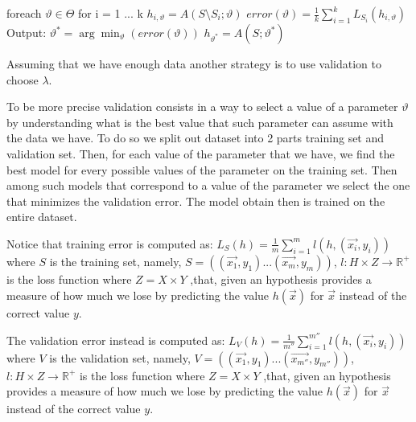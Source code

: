 \documentclass[a4paper,11pt,oneside]{book}
\begin{document}
\begin{enumerate}
\begin{solution}
                foreach $\vartheta \in \Theta$
                for i = 1 ... k
                    $h_{i,\vartheta} = A(S\setminus S_i; \vartheta)$
                $error(\vartheta) = \frac{1}{k}\sum_{i=1}^k L_{S_i}(h_{i,\vartheta})$
                Output: $\vartheta^* = \arg\min_\vartheta(error(\vartheta))$
                    $h_{\vartheta^*} = A(S;\vartheta^*)$
                
                Assuming that we have enough data another strategy is to use validation to choose $\lambda$.
                
                To be more precise validation consists in a way to select a value of a parameter $\vartheta$ by understanding what is the best value that such parameter can assume with the data we have.
                To do so we split out dataset into 2 parts training set and validation set. Then, for each value of the parameter that we have, we find the best model for every possible values of the parameter on the training set. Then among such models that correspond to a value of the parameter we select the one that minimizes the validation error. The model obtain then is trained on the entire dataset.
                
                Notice that training error is computed as: $L_S(h) = \frac{1}{m}\sum_{i=1}^m l(h,(\vec{x_i},y_i))$ where $S$ is the training set, namely, $S = ((\vec{x_1},y_1)...(\vec{x_m},y_m))$, $l: H\times Z \to \mathbb{R}^+$ is the loss function where $Z = X\times Y$ ,that, given an hypothesis provides a measure of how much we lose by predicting the value $h(\vec{x})$ for $\vec{x}$ instead of the correct value $y$.
                
                The validation error instead is computed as: $L_V(h) = \frac{1}{m''}\sum_{i=1}^{m''} l(h,(\vec{x_i},y_i))$ where $V$ is the validation set, namely, $V = ((\vec{x_1},y_1)...(\vec{x_{m''}},y_{m''}))$, $l: H\times Z \to \mathbb{R}^+$ is the loss function where $Z = X\times Y$ ,that, given an hypothesis provides a measure of how much we lose by predicting the value $h(\vec{x})$ for $\vec{x}$ instead of the correct value $y$.
            \end{solution}
    \end{enumerate}

\clearpage
\end{document}
